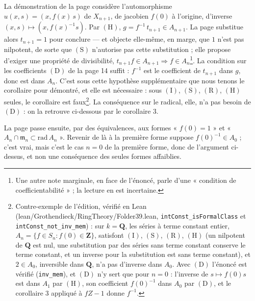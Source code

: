 \documentclass[11pt,a4paper]{article}
\begin{document}
La démonstration de la page considère l'automorphisme
$u(x, s) = (x, f(x)\, s)$ de $X_{n+1}$, de jacobien $f(0)$ à l'origine, d'inverse
$(x, s) \mapsto (x, f(x)^{-1} s)$. Par $(\mathrm{H})$,
$g = f^{-1}\, t_{n+1} \in A_{n+1}$. La page substitue alors $t_{n+1} = 1$ pour
conclure — et objecte elle-même, en marge, que $1$ n'est pas nilpotent, de
sorte que $(\mathrm{S})$ n'autorise pas cette substitution ; elle propose
d'exiger une propriété de divisibilité, $t_{n+1} f \in A_{n+1} \Rightarrow
f \in A_n$\footnote{Une autre note marginale, en face de l'énoncé, parle d'une
« condition de coefficientabilité » ; la lecture en est incertaine.}. La
condition sur les coefficients $(\mathrm{D})$ de la page 14 suffit : $f^{-1}$ est
le coefficient de $t_{n+1}$ dans $g$, donc est dans $A_n$. C'est sous cette
hypothèse supplémentaire que nous tenons le corollaire pour démontré, et
elle est nécessaire : sous $(\mathrm{I})$, $(\mathrm{S})$, $(\mathrm{R})$,
$(\mathrm{H})$ seules, le corollaire est faux\footnote{Contre-exemple de
l'édition, vérifié en Lean (lean/Grothendieck/RingTheory/Folder39.lean,
\texttt{intConst\_isFormalClass} et \texttt{intConst\_not\_inv\_mem}) : sur
$k = \mathbf{Q}$, les séries à terme constant entier,
$A_n = \{f \in S_n : f(0) \in \mathbf{Z}\}$, satisfont $(\mathrm{I})$,
$(\mathrm{S})$, $(\mathrm{R})$, $(\mathrm{H})$ (un nilpotent de $\mathbf{Q}$ est
nul, une substitution par des séries sans terme constant conserve le terme
constant, et un inverse pour la substitution est sans terme constant), et
$2 \in A_0$, inversible dans $\mathbf{Q}$, n'a pas d'inverse dans $A_0$. Avec
$(\mathrm{D})$ l'énoncé est vérifié (\texttt{inv\_mem}), et $(\mathrm{D})$ n'y
sert que pour $n = 0$ : l'inverse de $s \mapsto f(0)s$ est dans $A_1$ par
$(\mathrm{H})$, son coefficient $f(0)^{-1}$ dans $A_0$ par $(\mathrm{D})$, et le
corollaire 3 appliqué à $fZ - 1$ donne $f^{-1}$.}. La conséquence sur le radical,
elle, n'a pas besoin de $(\mathrm{D})$ : on la retrouve ci-dessous par le
corollaire 3.

La page passe ensuite, par des équivalences, aux formes « $f(0) = 1$ » et
« $A_n \cap \mathfrak{m}_n \subset \mathrm{rad}\, A_n$ ». Revenir de là à la
première forme suppose $f(0)^{-1} \in A_0$ ; c'est vrai, mais c'est le cas
$n = 0$ de la première forme, donc de l'argument ci-dessus, et non une
conséquence des seules formes affaiblies.
\end{document}
